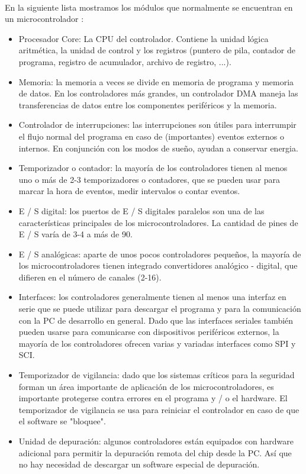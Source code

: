 \paragraph{}
En la siguiente lista mostramos los módulos que normalmente se encuentran en un microcontrolador \citep{MarcoTeoricoMicrocontrolador}:
\begin{itemize}
	\item Procesador Core: La CPU del controlador. Contiene la unidad lógica aritmética, la unidad de control y los registros (puntero de pila, contador de programa, registro de acumulador, archivo de registro, ...).
    \item Memoria: la memoria a veces se divide en memoria de programa y memoria de datos. En los controladores más grandes, un controlador DMA maneja las transferencias de datos entre los componentes periféricos y la memoria.
    \item Controlador de interrupciones: las interrupciones son útiles para interrumpir el flujo normal del programa en caso de (importantes) eventos externos o internos. En conjunción con los modos de sueño, ayudan a conservar energia.
    \item Temporizador o contador: la mayoría de los controladores tienen al menos uno o más de 2-3 temporizadores o contadores, que se pueden usar para marcar la hora de eventos, medir intervalos o contar eventos.
    \item E / S digital: los puertos de E / S digitales paralelos son una de las características principales de los microcontroladores. La cantidad de pines de E / S varía de 3-4 a más de 90.
    \item E / S analógicas: aparte de unos pocos controladores pequeños, la mayoría de los microcontroladores tienen integrado convertidores analógico - digital, que difieren en el número de canales (2-16). 
    \item Interfaces: los controladores generalmente tienen al menos una interfaz en serie que se puede utilizar para descargar el programa y para la comunicación con la PC de desarrollo en general. Dado que las interfaces seriales también pueden usarse para comunicarse con dispositivos periféricos externos, la mayoría de los controladores ofrecen varias y variadas interfaces como SPI y SCI.
    \item Temporizador de vigilancia: dado que los sistemas críticos para la seguridad forman un área importante de aplicación de los microcontroladores, es importante protegerse contra errores en el programa y / o el hardware. El temporizador de vigilancia se usa para reiniciar el controlador en caso de que el software se "bloquee".
    \item Unidad de depuración: algunos controladores están equipados con hardware adicional para permitir la depuración remota del chip desde la PC. Así que no hay necesidad de descargar un software especial de depuración.
\end{itemize}




